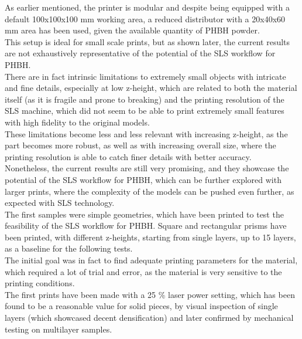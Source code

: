 \documentclass{article}
\begin{document}
          As earlier mentioned, the printer is modular and despite being equipped 
          with a default 100x100x100 mm working area, a reduced distributor with a 20x40x60 mm area has been used, 
          given the available quantity of PHBH powder. \\ 
  
          This setup is ideal for small scale prints, but as shown later, the current results 
          are not exhaustively representative of the potential of the SLS workflow for PHBH. \\
  
          There are in fact intrinsic limitations to extremely small objects with intricate and fine details,
          especially at low z-height, which are related to both the material itself (as it is fragile and prone to 
          breaking) and the printing resolution of the SLS machine, which 
          did not seem to be able to print extremely small features with high fidelity to the original models. \\
  
          These limitations become less and less relevant with increasing z-height, as the part becomes 
          more robust, as well as with increasing overall size, where the printing resolution 
          is able to catch finer details with better accuracy. \\
  
          Nonetheless, the current results are still very promising, and they showcase the potential of the SLS workflow
          for PHBH, which can be further explored with larger prints, where the complexity of the models 
          can be pushed even further, as expected with SLS technology. \\  
  
          The first samples were simple geometries, which have been printed to test the feasibility of the SLS workflow 
          for PHBH. Square and rectangular prisms have been printed, with different z-heights, starting from single 
          layers, up to 15 layers, as a baseline for the following tests. \\ 
  
          The initial goal was in fact to find adequate printing parameters for the material, which required a lot 
          of trial and error, as the material is very sensitive to the printing conditions. \\
  
          The first prints have been made with a 25 \%  laser power setting, which has been found to be 
          a reasonable value for solid pieces, by visual inspection of single layers (which showcased 
          decent densification) and later confirmed by 
          mechanical testing on multilayer samples. 
          
\end{document}
